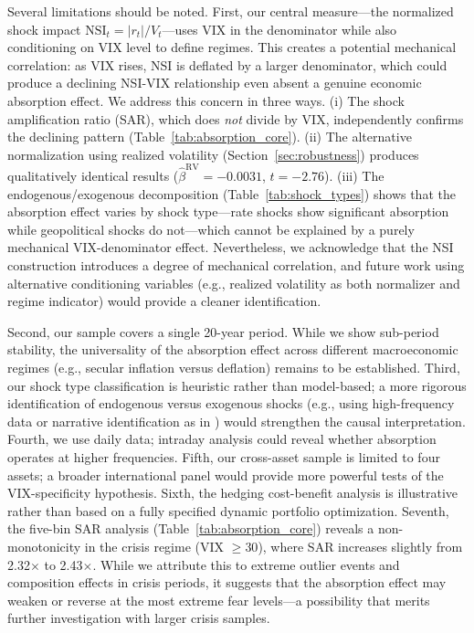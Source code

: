 \documentclass[12pt,a4paper]{article}
\begin{document}
Several limitations should be noted. First, our central measure---the normalized shock impact $\text{NSI}_t = |r_t| / V_t$---uses VIX in the denominator while also conditioning on VIX level to define regimes. This creates a potential mechanical correlation: as VIX rises, NSI is deflated by a larger denominator, which could produce a declining NSI-VIX relationship even absent a genuine economic absorption effect. We address this concern in three ways. (i) The shock amplification ratio (SAR), which does \textit{not} divide by VIX, independently confirms the declining pattern (Table~\ref{tab:absorption_core}). (ii) The alternative normalization using realized volatility (Section~\ref{sec:robustness}) produces qualitatively identical results ($\hat{\beta}^{\text{RV}} = -0.0031$, $t = -2.76$). (iii) The endogenous/exogenous decomposition (Table~\ref{tab:shock_types}) shows that the absorption effect varies by shock type---rate shocks show significant absorption while geopolitical shocks do not---which cannot be explained by a purely mechanical VIX-denominator effect. Nevertheless, we acknowledge that the NSI construction introduces a degree of mechanical correlation, and future work using alternative conditioning variables (e.g., realized volatility as both normalizer and regime indicator) would provide a cleaner identification.

Second, our sample covers a single 20-year period. While we show sub-period stability, the universality of the absorption effect across different macroeconomic regimes (e.g., secular inflation versus deflation) remains to be established. Third, our shock type classification is heuristic rather than model-based; a more rigorous identification of endogenous versus exogenous shocks (e.g., using high-frequency data or narrative identification as in \citealt{romer2004}) would strengthen the causal interpretation. Fourth, we use daily data; intraday analysis could reveal whether absorption operates at higher frequencies. Fifth, our cross-asset sample is limited to four assets; a broader international panel would provide more powerful tests of the VIX-specificity hypothesis. Sixth, the hedging cost-benefit analysis is illustrative rather than based on a fully specified dynamic portfolio optimization. Seventh, the five-bin SAR analysis (Table~\ref{tab:absorption_core}) reveals a non-monotonicity in the crisis regime (VIX $\geq 30$), where SAR increases slightly from 2.32$\times$ to 2.43$\times$. While we attribute this to extreme outlier events and composition effects in crisis periods, it suggests that the absorption effect may weaken or reverse at the most extreme fear levels---a possibility that merits further investigation with larger crisis samples.
\end{document}
